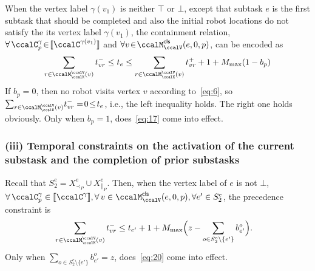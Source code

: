 \documentclass[journal]{IEEEtran}
\newcommand{\clause}[1]{\llbracket \ccalC^{#1} \rrbracket}
\newcommand{\domanda}[1]{\subsubsection*{#1}}
\begin{document}
{When the vertex label $\gamma(v_1)$ is neither $\top$ or $\bot$, except that subtask $e$ is the first subtask that should be completed and also the initial robot locations do not satisfy the its vertex label $\gamma(v_1)$, the containment relation, $\forall\, \ccalC_p^{\gamma} \!\in\! \clause{\gamma(v_1)}$ and $\forall v \!\in\! \ccalM^\mathsf{cls}_\ccalV(e,0,p)$, can be encoded as
\begingroup\makeatletter\def\f@size{9}\check@mathfonts
\def\maketag@@@#1{\hbox{\m@th\normalsize\normalfont#1}}%
  \begin{align}
 \sum_{r\in \ccalM^\ccalV_{\ccalK}(v)} t_{vr}^-  \leq  t_e \leq
    \sum_{r\in \ccalM^\ccalV_{\ccalK}(v)} t_{vr}^+ + 1  + M_{\max} (1 - b_{p}) \label{eq:17}
  \end{align}
  \endgroup
If $b_p=0$, then no robot visits vertex $v$ according to~\eqref{eq:6}, so~ $ \sum_{r\in \ccalM^\ccalV_{\ccalK}(v)} \!t_{vr}^- =\! 0\! \leq \!t_e$, i.e., the left inequality holds. The right one holds obviously. {Only when $b_p=1$, does~\eqref{eq:17} come into effect.} 


\domanda{(iii) Temporal constraints on  the  activation of the current substask and the completion  of prior substasks}
 Recall that $S_2^e = X^e_{\prec_{P}} \cup X^e_{\|_{P}}$. 
Then, when the vertex label of $e$ is not $\bot$, $\forall \, \ccalC_p^{\gamma} \in \clause{\gamma} , \forall \,v \in \ccalM^\mathsf{cls}_\ccalV(e,0,p), \forall e' \in S_2^e$, the precedence constraint is
\begingroup\makeatletter\def\f@size{9}\check@mathfonts
\def\maketag@@@#1{\hbox{\m@th\normalsize\normalfont#1}}%
\begin{align}\label{eq:20}
  & \sum_{r\in \ccalM^\ccalV_{\ccalK}(v)} t_{vr}^-   \leq t_{e'}  + 1 +
  M_{\max} \Big(z  - \sum_{o \in S_2^e\setminus \{e'\}} b_{e'}^o\Big).
\end{align}
\endgroup
Only when $ \sum_{o\in S_2^e\setminus \{e'\}} b_{e'}^o = z $, does~\eqref{eq:20} come into effect.

}
\end{document}
